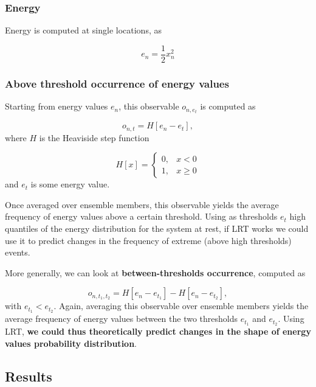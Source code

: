 \documentclass{article}
\begin{document}
\subsubsection{Energy}

Energy is computed at single locations, as

\begin{equation}
e_n=\frac{1}{2} x_n^{2}
\end{equation}

\subsubsection{Above threshold occurrence of energy values}

Starting from energy values $e_n$, this observable $o_{n, e_t}$ is computed as

\begin{equation}
o_{n, t}=H[e_n - e_t],
\end{equation}
where $H$ is the Heaviside step function

\begin{equation}
	H[x]=\left\{\begin{array}{ll}{0,} & {x<0} \\ {1,} & {x \geq 0}\end{array}\right.
\end{equation}
and $e_t$ is some energy value.

Once averaged over ensemble members, this observable yields the average frequency of energy values above a certain threshold. Using as thresholds $e_t$ high quantiles of the energy distribution for the system at rest, if LRT works we could use it to predict changes in the frequency of extreme (above high thresholds) events.

More generally, we can look at \textbf{between-thresholds occurrence}, computed as

\begin{equation}
o_{n, t_1, t_2}=H[e_n - e_{t_1}] - H[e_n - e_{t_2}],
\end{equation}
with $e_{t_1} < e_{t_2}$. Again, averaging this observable over ensemble members yields the average frequency of energy values between the two thresholds $e_{t_1}$ and $e_{t_2}$. Using LRT, \textbf{we could thus theoretically predict changes in the shape of energy values probability distribution}.

\subsection{Results}\label{results}
\end{document}
